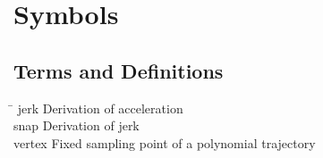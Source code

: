 \newpage


\chapter*{Symbols}\label{chap:symbole}


% 

\section*{Terms and Definitions}
\begin{tabbing}
 \hspace*{1.6cm}  \= \kill
jerk \> Derivation of acceleration \\[0.5ex]
snap \> Derivation of jerk \\[0.5ex]
vertex \> Fixed sampling point of a polynomial trajectory \\[0.5ex]
\end{tabbing}

